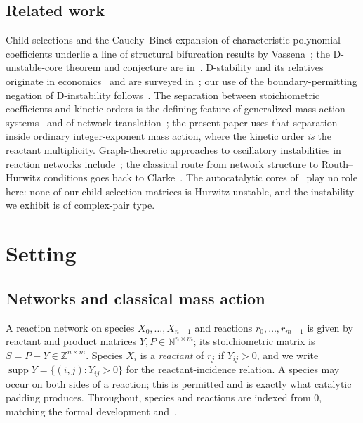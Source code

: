 \documentclass[11pt,a4paper]{article}
\theoremstyle{plain}
\theoremstyle{definition}
\theoremstyle{remark}
\newcommand{\N}{\mathbb{N}}
\newcommand{\Z}{\mathbb{Z}}
\newcommand{\supp}{\operatorname{supp}}
\begin{document}
\subsection*{Related work}

Child selections and the Cauchy--Binet expansion of characteristic-polynomial coefficients underlie a line of structural bifurcation results by Vassena~\cite{Vassena2023SaddleNode,Vassena2023Symbolic}; the D-unstable-core theorem and conjecture are in~\cite{VassenaStadler2024}. D-stability and its relatives originate in economics~\cite{ArrowMcManus1958,Johnson1974} and are surveyed in~\cite{Cross1978,Hershkowitz1992,Kushel2019}; our use of the boundary-permitting negation of D-instability follows~\cite{Companion2026}. The separation between stoichiometric coefficients and kinetic orders is the defining feature of generalized mass-action systems~\cite{MullerRegensburger2012,MullerRegensburger2014} and of network translation~\cite{Johnston2014}; the present paper uses that separation inside ordinary integer-exponent mass action, where the kinetic order \emph{is} the reactant multiplicity. Graph-theoretic approaches to oscillatory instabilities in reaction networks include~\cite{MinchevaRoussel2007,AngeliBanajiPantea2014}; the classical route from network structure to Routh--Hurwitz conditions goes back to Clarke~\cite{Clarke1980}. The autocatalytic cores of~\cite{BlokhuisLacosteNghe2020} play no role here: none of our child-selection matrices is Hurwitz unstable, and the instability we exhibit is of complex-pair type.

\section{Setting}\label{sec:setting}

\subsection{Networks and classical mass action}

A reaction network on species $X_0,\dots,X_{n-1}$ and reactions $r_0,\dots,r_{m-1}$ is given by reactant and product matrices $Y,P\in\N^{n\times m}$; its stoichiometric matrix is $S=P-Y\in\Z^{n\times m}$. Species $X_i$ is a \emph{reactant} of $r_j$ if $Y_{ij}>0$, and we write $\supp Y=\{(i,j): Y_{ij}>0\}$ for the reactant-incidence relation. A species may occur on both sides of a reaction; this is permitted and is exactly what catalytic padding produces. Throughout, species and reactions are indexed from $0$, matching the formal development and~\cite{Companion2026}.
\end{document}
